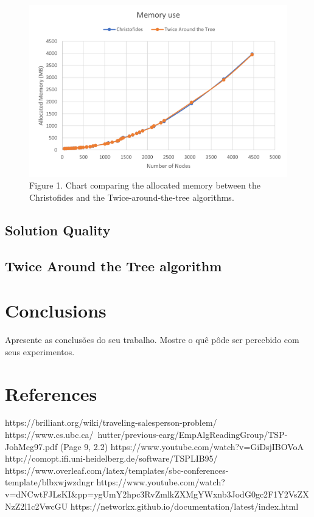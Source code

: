 \documentclass[12pt]{article}
\begin{document}

\begin{figure}[ht]
\centering
\includegraphics[width=.5\textwidth]{memory_use_comparison.png}
\caption{Figure 1. Chart comparing the allocated memory between the Christofides and the Twice-around-the-tree algorithms.}
\label{fig:mem_use}
\end{figure}

\subsection{Solution Quality}

\subsection{Twice Around the Tree algorithm}


\section{Conclusions}
    Apresente as conclusões do seu trabalho. Mostre o quê pôde ser percebido
    com seus experimentos.

\section{References}

https://brilliant.org/wiki/traveling-salesperson-problem/
https://www.cs.ubc.ca/~hutter/previous-earg/EmpAlgReadingGroup/TSP-JohMcg97.pdf (Page 9, 2.2)
https://www.youtube.com/watch?v=GiDsjIBOVoA
http://comopt.ifi.uni-heidelberg.de/software/TSPLIB95/
https://www.overleaf.com/latex/templates/sbc-conferences-template/blbxwjwzdngr
https://www.youtube.com/watch?v=dNCwtFJLsKI&pp=ygUmY2hpc3RvZmlkZXMgYWxnb3JodG0gc2F1Y2VsZXNzZ2l1c2VwcGU%
https://networkx.github.io/documentation/latest/index.html



\end{document}
